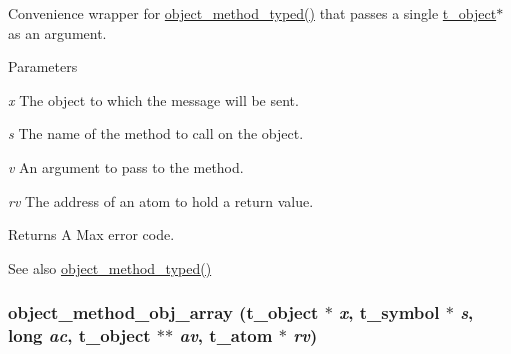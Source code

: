 Convenience wrapper for \hyperlink{group__obj_ga443dee482af22e0fe83e68955d367226}{object\_\-method\_\-typed()} that passes a single \hyperlink{structt__object}{t\_\-object}$\ast$ as an argument. 
\begin{DoxyParams}{Parameters}
\item[{\em x}]The object to which the message will be sent. \item[{\em s}]The name of the method to call on the object. \item[{\em v}]An argument to pass to the method. \item[{\em rv}]The address of an atom to hold a return value.\end{DoxyParams}
\begin{DoxyReturn}{Returns}
A Max error code. 
\end{DoxyReturn}
\begin{DoxySeeAlso}{See also}
\hyperlink{group__obj_ga443dee482af22e0fe83e68955d367226}{object\_\-method\_\-typed()} 
\end{DoxySeeAlso}
\hypertarget{group__obj_ga941f7a1161a097394a6924df0c03a1ea}{
\subsubsection[{object\_\-method\_\-obj\_\-array}]{ object\_\-method\_\-obj\_\-array ({\bf t\_\-object} $\ast$ {\em x}, \/  {\bf t\_\-symbol} $\ast$ {\em s}, \/  long {\em ac}, \/  {\bf t\_\-object} $\ast$$\ast$ {\em av}, \/  {\bf t\_\-atom} $\ast$ {\em rv})}}
\label{group__obj_ga941f7a1161a097394a6924df0c03a1ea}


